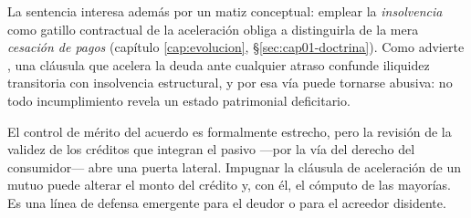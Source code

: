La sentencia interesa además por un matiz conceptual: emplear la \emph{insolvencia} como gatillo
contractual de la aceleración obliga a distinguirla de la mera \emph{cesación de pagos}
(capítulo \ref{cap:evolucion}, \S\ref{sec:cap01-doctrina}). Como advierte
\textcite{corral-insolvencia-cesacion}, una cláusula que acelera la deuda ante cualquier atraso
confunde iliquidez transitoria con insolvencia estructural, y por esa vía puede tornarse
abusiva: no todo incumplimiento revela un estado patrimonial deficitario.

\begin{foco}
El control de mérito del acuerdo es formalmente estrecho, pero la revisión de la validez de los
créditos que integran el pasivo ---por la vía del derecho del consumidor--- abre una puerta
lateral. Impugnar la cláusula de aceleración de un mutuo puede alterar el monto del crédito y,
con él, el cómputo de las mayorías. Es una línea de defensa emergente para el deudor o para el
acreedor disidente.
\end{foco}
